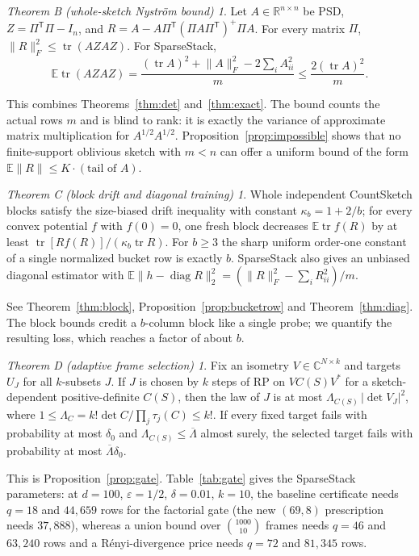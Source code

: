 \documentclass[11pt,a4paper]{article}
\theoremstyle{definition}
\theoremstyle{remark}
\newtheorem*{mainB}{Theorem B (whole-sketch Nystr\"om bound)}
\newtheorem*{mainC}{Theorem C (block drift and diagonal training)}
\newtheorem*{mainD}{Theorem D (adaptive frame selection)}
\newcommand{\E}{\mathbb E}
\newcommand{\R}{\mathbb R}
\newcommand{\C}{\mathbb C}
\newcommand{\tr}{\operatorname{tr}}
\newcommand{\diag}{\operatorname{diag}}
\newcommand{\eps}{\varepsilon}
\newcommand{\norm}[1]{\lVert#1\rVert}
\newcommand{\1}{\mathbf 1}
\newcommand{\T}{\mathsf T}
\newcommand{\Lbar}{\overline\Lambda}
\begin{document}
\begin{mainB}
Let $A\in\R^{n\times n}$ be PSD, $Z=\Pi^\T\Pi-I_n$, and
$R=A-A\Pi^\T(\Pi A\Pi^\T)^+\Pi A$. For every matrix $\Pi$,
$\norm R_F^2\le\tr(AZAZ)$. For SparseStack,
\[
 \E\tr(AZAZ)=\frac{(\tr A)^2+\norm A_F^2-2\sum_iA_{ii}^2}{m}
 \le\frac{2(\tr A)^2}{m}.
\]
\end{mainB}
This combines Theorems~\ref{thm:det} and~\ref{thm:exact}. The bound counts the
actual rows $m$ and is blind to rank: it is exactly the variance of
approximate matrix multiplication for $A^{1/2}A^{1/2}$.
Proposition~\ref{prop:impossible} shows that no finite-support oblivious
sketch with $m<n$ can offer a uniform bound of the form
$\E\norm R\le K\cdot(\text{tail of }A)$.

\begin{mainC}
Whole independent CountSketch blocks satisfy the size-biased drift
inequality with constant $\kappa_b=1+2/b$; for every convex potential $f$
with $f(0)=0$, one fresh block decreases $\E\tr f(R)$ by at least
$\tr[Rf(R)]/(\kappa_b\tr R)$. For $b\ge3$ the sharp uniform order-one
constant of a single normalized bucket row is exactly $b$. SparseStack
also gives an unbiased diagonal estimator with
$\E\norm{h-\diag R}_2^2=(\norm R_F^2-\sum_iR_{ii}^2)/m$.
\end{mainC}
See Theorem~\ref{thm:block}, Proposition~\ref{prop:bucketrow} and
Theorem~\ref{thm:diag}. The block bounds credit a $b$-column block like a
single probe; we quantify the resulting loss, which reaches a factor of
about $b$.

\begin{mainD}
Fix an isometry $V\in\C^{N\times k}$ and targets $U_J$ for all
$k$-subsets $J$. If $J$ is chosen by $k$ steps of RP on $VC(S)V^*$ for a
sketch-dependent positive-definite $C(S)$, then the law of $J$ is at most
$\Lambda_{C(S)}\,|\det V_J|^2$, where
$1\le\Lambda_C=k!\det C/\prod_j\tau_j(C)\le k!$. If every fixed target
fails with probability at most $\delta_0$ and $\Lambda_{C(S)}\le\Lbar$
almost surely, the selected target fails with probability at most
$\Lbar\delta_0$.
\end{mainD}
This is Proposition~\ref{prop:gate}. Table~\ref{tab:gate} gives the
SparseStack parameters: at $d=100$, $\eps=1/2$, $\delta=0.01$, $k=10$, the
baseline certificate needs $q=18$ and $44{,}659$ rows for the factorial
gate (the new $(69,8)$ prescription needs $37{,}888$), whereas a union bound
over $\binom{1000}{10}$ frames needs $q=46$ and $63{,}240$ rows and a
R\'enyi-divergence price needs $q=72$ and $81{,}345$ rows.
\end{document}
